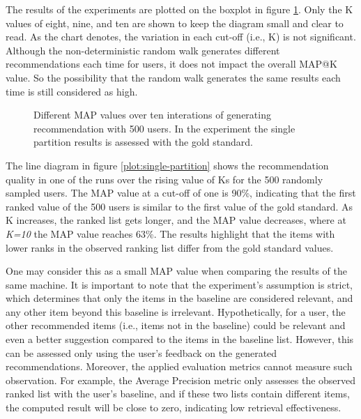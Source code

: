 The results of the experiments are plotted on the boxplot in figure \ref{plot:single-partition-boxplot}. Only the K values of eight, nine, and ten are shown to keep the diagram small and clear to read. As the chart denotes, the variation in each cut-off (i.e., K) is not significant. Although the non-deterministic random walk generates different recommendations each time for users, it does not impact the overall MAP@K value. So the possibility that the random walk generates the same results each time is still considered as high.


\begin{figure}[!htb]
    \centering
    
    \caption{Different MAP values over ten interations of generating recommendation with 500 users. In the experiment the single partition results is assessed with the gold standard.}
    \label{plot:single-partition-boxplot}
\end{figure}



The line diagram in figure \ref{plot:single-partition} shows the recommendation quality in one of the runs over the rising value of Ks for the 500 randomly sampled users. The MAP value at a cut-off of one is 90\%, indicating that the first ranked value of the 500 users is similar to the first value of the gold standard. As K increases, the ranked list gets longer, and the MAP value decreases, where at \emph{K=10} the MAP value reaches 63\%. The results highlight that the items with lower ranks in the observed ranking list differ from the gold standard values.


One may consider this as a small MAP value when comparing the results of the same machine. It is important to note that the experiment's assumption is strict, which determines that only the items in the baseline are considered relevant, and any other item beyond this baseline is irrelevant. Hypothetically, for a user, the other recommended items (i.e., items not in the baseline) could be relevant and even a better suggestion compared to the items in the baseline list. However, this can be assessed only using the user's feedback on the generated recommendations. Moreover, the applied evaluation metrics cannot measure such observation. For example, the Average Precision metric only assesses the observed ranked list with the user's baseline, and if these two lists contain different items, the computed result will be close to zero, indicating low retrieval effectiveness.

